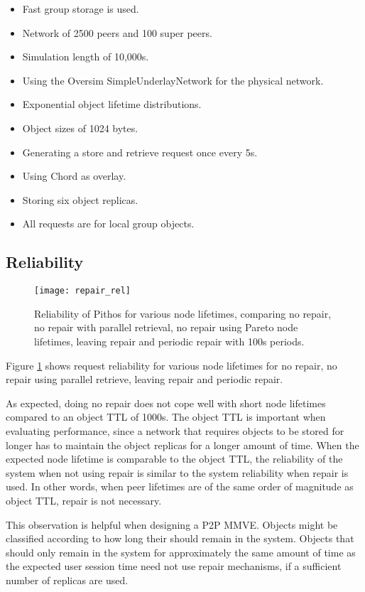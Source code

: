 \begin{itemize}
\item Fast group storage is used.
\item Network of 2500 peers and 100 super peers.
\item Simulation length of 10,000s.
\item Using the Oversim SimpleUnderlayNetwork for the physical network.
\item Exponential object lifetime distributions.
\item Object sizes of 1024 bytes.
\item Generating a store and retrieve request once every 5s.
\item Using Chord as overlay.
\item Storing six object replicas.
\item All requests are for local group objects.
\end{itemize}

\subsection{Reliability}

\begin{figure}[htbp]
 \centering
 \texttt{[image: repair\_rel]}
 \caption{Reliability of Pithos for various node lifetimes, comparing no repair, no repair with parallel retrieval, no repair using Pareto node lifetimes, leaving repair and periodic repair with 100s periods.}
 \label{fig_repair_rel}
\end{figure}
%
Figure \ref{fig_repair_rel} shows request reliability for various node lifetimes for no repair, no repair using parallel retrieve, leaving repair and periodic repair.

As expected, doing no repair does not cope well with short node lifetimes compared to an object TTL of 1000s. The object TTL is important when evaluating performance, since a network that requires objects to be stored for longer has to maintain the object replicas for a longer amount of time. When the expected node lifetime is comparable to the object TTL, the reliability of the system when not using repair is similar to the system reliability when repair is used. In other words, when peer lifetimes are of the same order of magnitude as object TTL, repair is not necessary.

This observation is helpful when designing a P2P MMVE. Objects might be classified according to how long their should remain in the system. Objects that should only remain in the system for approximately the same amount of time as the expected user session time need not use repair mechanisms, if a sufficient number of replicas are used.

